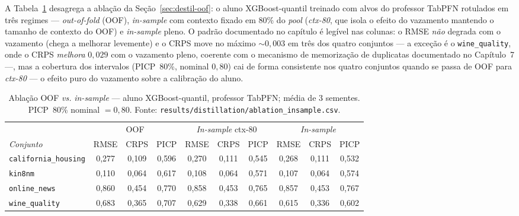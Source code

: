 A Tabela~\ref{tab:app-abl-oof} desagrega a ablação da
Seção~\ref{sec:destil-oof}: o aluno XGBoost-quantil treinado com alvos
do professor TabPFN rotulados em três regimes --- \emph{out-of-fold}
(OOF), \emph{in-sample} com contexto fixado em 80\% do \emph{pool}
(\emph{ctx-80}, que isola o efeito do vazamento mantendo o tamanho de
contexto do OOF) e \emph{in-sample} pleno. O padrão documentado no
capítulo é legível nas colunas: o RMSE \emph{não} degrada com o
vazamento (chega a melhorar levemente) e o CRPS move no máximo
${\sim}0{,}003$ em três dos quatro conjuntos --- a exceção é o
\texttt{wine\_quality}, onde o CRPS \emph{melhora} $0{,}029$ com o
vazamento pleno, coerente com o mecanismo de memorização de
duplicatas documentado no Capítulo~7 ---, mas a cobertura dos
intervalos (PICP~80\%, nominal $0{,}80$) cai de forma consistente nos
quatro conjuntos quando se passa de OOF para \emph{ctx-80} --- o
efeito puro do vazamento sobre a calibração do aluno.

\begin{table}[htbp]
\centering\small
\caption[Ablação OOF \emph{vs.} \emph{in-sample} ---
desagregada]{Ablação OOF \emph{vs.} \emph{in-sample} --- aluno
XGBoost-quantil, professor TabPFN; média de 3 sementes. PICP~80\%
nominal $= 0{,}80$. Fonte:
\texttt{results/\allowbreak distillation/\allowbreak ablation\_\allowbreak insample.\allowbreak csv}.}
\label{tab:app-abl-oof}
\setlength{\tabcolsep}{4.5pt}
\begin{tabular}{lccccccccc}
\toprule
 & \multicolumn{3}{c}{OOF} & \multicolumn{3}{c}{\emph{In-sample}
 ctx-80} & \multicolumn{3}{c}{\emph{In-sample}} \\
\cmidrule(lr){2-4}\cmidrule(lr){5-7}\cmidrule(lr){8-10}
\emph{Conjunto} & RMSE & CRPS & PICP & RMSE & CRPS & PICP
               & RMSE & CRPS & PICP \\
\midrule
\texttt{california\_\allowbreak housing} & 0{,}277 & 0{,}109 & 0{,}596
  & 0{,}270 & 0{,}111 & 0{,}545 & 0{,}268 & 0{,}111 & 0{,}532 \\
\texttt{kin8nm}              & 0{,}110 & 0{,}064 & 0{,}617
  & 0{,}108 & 0{,}064 & 0{,}571 & 0{,}107 & 0{,}064 & 0{,}574 \\
\texttt{online\_news}         & 0{,}860 & 0{,}454 & 0{,}770
  & 0{,}858 & 0{,}453 & 0{,}765 & 0{,}857 & 0{,}453 & 0{,}767 \\
\texttt{wine\_quality}       & 0{,}683 & 0{,}365 & 0{,}707
  & 0{,}629 & 0{,}338 & 0{,}661 & 0{,}615 & 0{,}336 & 0{,}602 \\
\bottomrule
\end{tabular}
\end{table}

